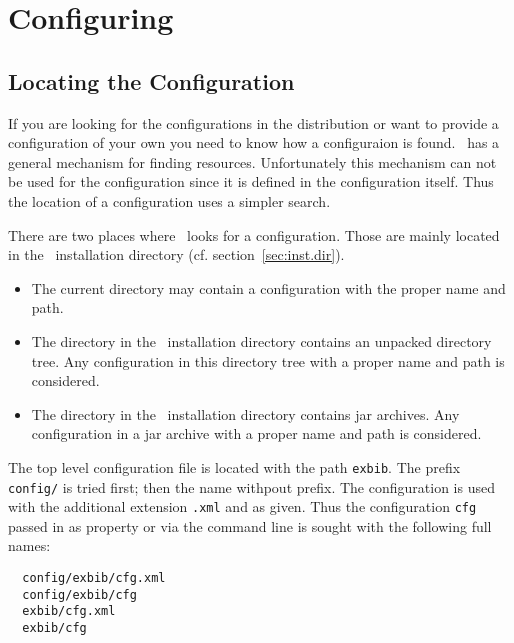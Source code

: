 

\section{Configuring \ExBib}

\subsection{Locating the Configuration}

If you are looking for the configurations in the distribution or want
to provide a configuration of your own you need to know how a
configuraion is found. \ExBib\ has a general mechanism for finding
resources. Unfortunately this mechanism can not be used for the
configuration since it is defined in the configuration itself. Thus
the location of a configuration uses a simpler search.

There are two places where \ExBib\ looks for a configuration. Those
are mainly located in the \ExBib\ installation directory (cf.
section~\ref{sec:inst.dir}).
\begin{itemize}
\item The current directory may contain a configuration with the
  proper name and path.
\item The directory  in the \ExBib\ installation
  directory contains an unpacked directory tree. Any configuration in
  this directory tree with a proper name and path is considered.
\item The directory  in the \ExBib\ installation directory
  contains jar archives. Any configuration in a jar archive with a
  proper name and path is considered.
\end{itemize}

The top level configuration file is located with the path
\texttt{exbib}. The prefix \texttt{config/} is tried first; then the
name withpout prefix. The configuration is used with the additional
extension \texttt{.xml} and as given. Thus the configuration
\texttt{cfg} passed in as property or via the command line is sought
with the following full names:
\begin{verbatim}
  config/exbib/cfg.xml
  config/exbib/cfg
  exbib/cfg.xml
  exbib/cfg
\end{verbatim}


